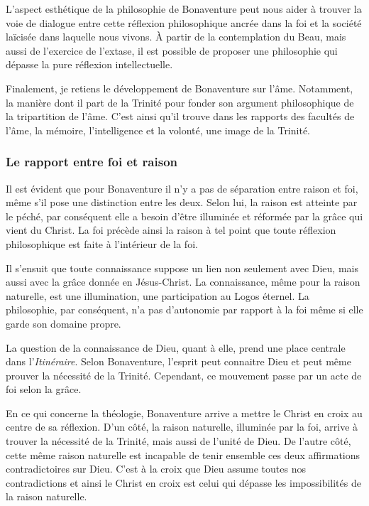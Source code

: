 L'aspect esthétique de la philosophie de Bonaventure peut nous aider à trouver la voie de dialogue entre cette réflexion philosophique ancrée dans la foi et la société laïcisée dans laquelle nous vivons.  À partir de la contemplation du Beau, mais aussi de l'exercice de l'extase, il est possible de proposer une philosophie qui dépasse la pure réflexion intellectuelle. 

Finalement, je retiens le développement de Bonaventure sur l'âme. Notamment, la manière dont il part de la Trinité pour fonder son argument philosophique de la tripartition de l'âme. C'est ainsi qu'il trouve dans les rapports des facultés de l'âme, la mémoire, l'intelligence et la volonté, une image de la Trinité. 

\subsubsection*{Le rapport entre foi et raison}

Il est évident que pour Bonaventure il n'y a pas de séparation entre raison et foi, même s'il pose une distinction entre les deux. Selon lui, la raison est atteinte par le péché, par conséquent elle a besoin d'être illuminée et réformée par la grâce qui vient du Christ. La foi précède ainsi la raison à tel point que toute réflexion philosophique est faite à l'intérieur de la foi. 

Il s'ensuit que toute connaissance suppose un lien non seulement avec Dieu, mais aussi avec la grâce donnée en Jésus-Christ. La connaissance, même pour la raison naturelle, est une illumination, une participation au Logos éternel. La philosophie, par conséquent, n'a pas d'autonomie par rapport à la foi même si elle garde son domaine propre. 

La question de la connaissance de Dieu, quant à elle, prend une place centrale dans l'\emph{Itinéraire}. Selon Bonaventure, l'esprit peut connaitre Dieu et peut même prouver la nécessité de la Trinité. Cependant, ce mouvement passe par un acte de foi selon la grâce.

En ce qui concerne la théologie, Bonaventure arrive a mettre le Christ en croix au centre de sa réflexion. D'un côté, la raison naturelle, illuminée par la foi, arrive à trouver la nécessité de la Trinité, mais aussi de l'unité de Dieu. De l'autre côté, cette même raison naturelle est incapable de tenir ensemble ces deux affirmations contradictoires sur Dieu. C'est à la croix que Dieu assume toutes nos contradictions et ainsi le Christ en croix est celui qui dépasse les impossibilités de la raison naturelle.

